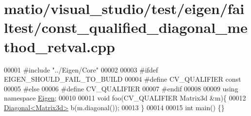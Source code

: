 \hypertarget{matio_2visual__studio_2test_2eigen_2failtest_2const__qualified__diagonal__method__retval_8cpp_source}{}\section{matio/visual\+\_\+studio/test/eigen/failtest/const\+\_\+qualified\+\_\+diagonal\+\_\+method\+\_\+retval.cpp}
\label{matio_2visual__studio_2test_2eigen_2failtest_2const__qualified__diagonal__method__retval_8cpp_source}

\begin{DoxyCode}
00001 \textcolor{preprocessor}{#include "../Eigen/Core"}
00002 
00003 \textcolor{preprocessor}{#ifdef EIGEN\_SHOULD\_FAIL\_TO\_BUILD}
00004 \textcolor{preprocessor}{#define CV\_QUALIFIER const}
00005 \textcolor{preprocessor}{#else}
00006 \textcolor{preprocessor}{#define CV\_QUALIFIER}
00007 \textcolor{preprocessor}{#endif}
00008 
00009 \textcolor{keyword}{using namespace }\hyperlink{namespace_eigen}{Eigen};
00010 
00011 \textcolor{keywordtype}{void} foo(CV\_QUALIFIER Matrix3d &m)\{
00012     \hyperlink{group___core___module_class_eigen_1_1_diagonal}{Diagonal<Matrix3d>} b(m.diagonal());
00013 \}
00014 
00015 \textcolor{keywordtype}{int} main() \{\}
\end{DoxyCode}
